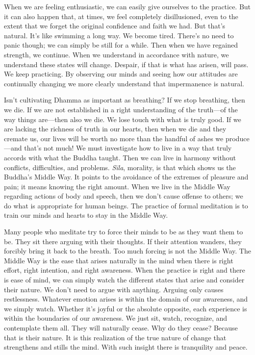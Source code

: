 When we are feeling enthusiastic, we can easily give ourselves to the 
practice. But it can also happen that, at times, we feel completely 
disillusioned, even to the extent that we forget the original 
confidence and faith we had. But that's natural. It's like swimming a 
long way. We become tired. There's no need to panic though; we can 
simply be still for a while. Then when we have regained strength, we 
continue. When we understand in accordance with nature, we understand 
these states will change. Despair, if that is what has arisen, will 
pass. We keep practicing. By observing our minds and seeing how our 
attitudes are continually changing we more clearly understand that 
impermanence is natural.

Isn't cultivating Dhamma as important as breathing? If we stop 
breathing, then we die. If we are not established in a right 
understanding of the truth---of the way things are---then also we die. 
We lose touch with what is truly good. If we are lacking the richness 
of truth in our hearts, then when we die and they cremate us, our lives 
will be worth no more than the handful of ashes we produce---and that's 
not much! We must investigate how to live in a way that truly accords 
with what the Buddha taught. Then we can live in harmony without 
conflicts, difficulties, and problems. \emph{Sīla}, morality, is that 
which shows us the Buddha's Middle Way. It points to the avoidance of 
the extremes of pleasure and pain; it means knowing the right amount. 
When we live in the Middle Way regarding actions of body and speech, 
then we don't cause offense to others; we do what is appropriate for 
human beings. The practice of formal meditation is to train our minds 
and hearts to stay in the Middle Way.

Many people who meditate try to force their minds to be as they want 
them to be. They sit there arguing with their thoughts. If their 
attention wanders, they forcibly bring it back to the breath. Too much 
forcing is not the Middle Way. The Middle Way is the ease that arises 
naturally in the mind when there is right effort, right intention, and 
right awareness. When the practice is right and there is ease of mind, 
we can simply watch the different states that arise and consider their 
nature. We don't need to argue with anything. Arguing only causes 
restlessness. Whatever emotion arises is within the domain of our 
awareness, and we simply watch. Whether it's joyful or the absolute 
opposite, each experience is within the boundaries of our awareness. We 
just sit, watch, recognize, and contemplate them all. They will 
naturally cease. Why do they cease? Because that is their nature. It is 
this realization of the true nature of change that strengthens and 
stills the mind. With such insight there is tranquility and peace.

